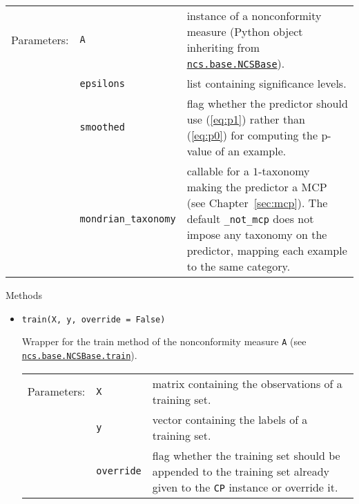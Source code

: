 \documentclass[twoside,11pt]{article}
\def\wo{~\\}
\begin{document}
\begin{appendices}
      \begin{tabu}{llX}
        Parameters: &\texttt{A}
                    &instance of a nonconformity measure
                     (Python object inheriting from
                     \hyperref[itm:ncsbase]
                     {\texttt{ncs.base.NCSBase}}).
                     \\
                    &\texttt{epsilons}
                    &list containing significance levels.
                     \\
                    &\texttt{smoothed}
                    &flag whether the predictor should use
                     (\ref{eq:p1}) rather than
                     (\ref{eq:p0}) for computing the
                     p-value of an example.
                     \\
                   &\texttt{mondrian\_taxonomy}
                   &callable for a $1$-taxonomy making the
                    predictor a MCP
                    (see Chapter~\ref{sec:mcp}).
                    The default \texttt{\_not\_mcp} does
                    not impose any taxonomy on the
                    predictor, mapping each example to the
                    same category.
                    \\
      \end{tabu}

      Methods

      \begin{itemize}

        \item
          \texttt{train(X, y, override = False)}
          \label{itm:cp_train}

          Wrapper for the train method of the nonconformity
          measure \texttt{A} (see \\ \hyperref
          [itm:ncsbase_train]
          {\texttt{ncs.base.NCSBase.train}}).

          \begin{tabu}{llX}
            Parameters: &\texttt{X}
                        &matrix containing the observations
                         of a training set.
                         \\
                        &\texttt{y}
                        &vector containing the labels of a
                         training set.
                         \\
                        &\texttt{override}
                        &flag whether the training set
                         should be appended to the training
                         set already given to the
                         \texttt{CP} instance or override
                         it.
          \end{tabu}
          \wo


\end{itemize}
\end{appendices}
\end{document}
